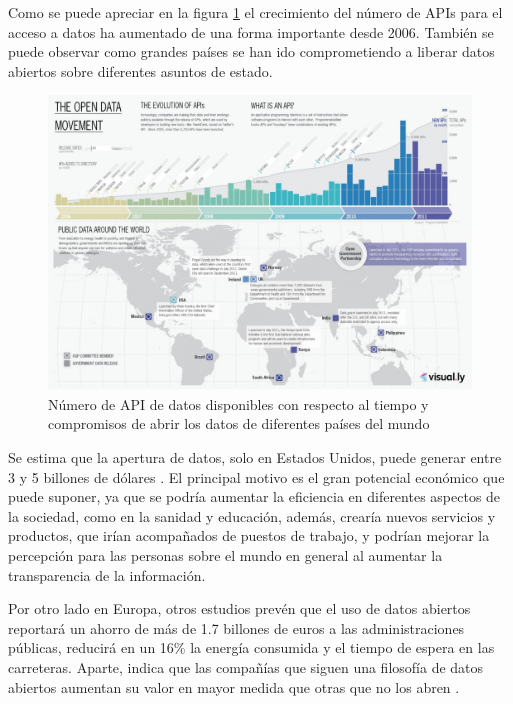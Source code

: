 Como se puede apreciar en la figura \ref{fig:opendata} el crecimiento del número de APIs para el acceso a datos ha aumentado de una forma importante desde 2006. También se puede observar como grandes países se han ido comprometiendo a liberar datos abiertos sobre diferentes asuntos de estado.

\begin{figure}[htp!]
\centering
\caption{Número de API de datos disponibles con respecto al tiempo y compromisos de abrir los datos de diferentes países del mundo \cite{graphdata}}
\label{fig:opendata}
\vspace{5pt}
\includegraphics[scale=0.3]{graphics/opendata}
\end{figure}


Se estima que la apertura de datos, solo en Estados Unidos, puede generar entre 3 y 5 billones de dólares \cite{revenueOpenData}. El principal motivo es el gran potencial económico que puede suponer, ya que se podría aumentar la eficiencia en diferentes aspectos de la sociedad, como en la sanidad y educación, además, crearía nuevos servicios y productos, que irían acompañados de puestos de trabajo, y podrían mejorar la percepción para las personas sobre el mundo en general al aumentar la transparencia de la información.

Por otro lado en Europa, otros estudios prevén que el uso de datos abiertos reportará un ahorro de más de 1.7 billones de euros a las administraciones públicas, reducirá en un 16\% la energía consumida y el tiempo de espera en las carreteras. Aparte, indica que las compañías que siguen una filosofía de datos abiertos aumentan su valor en mayor medida que otras que no los abren \cite{valueOpenData}.

